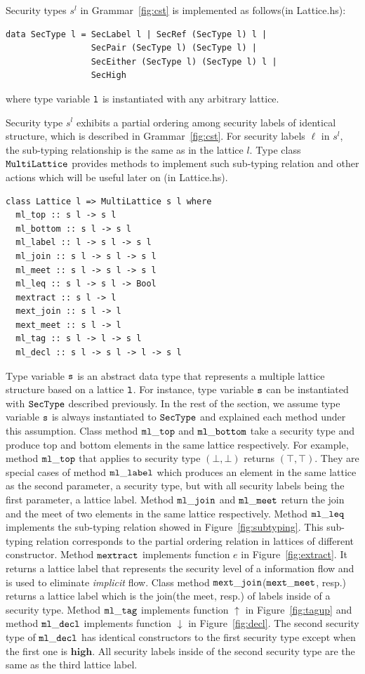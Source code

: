 \documentclass{report}
\newcommand{\co}[1]{$\cod{#1}$}
\newcommand{\st}{s^l}
\newcommand{\tagup}{\uparrow}
\newcommand{\decl}{\downarrow}
\begin{document}
Security types $\st$ in Grammar~\ref{fig:cst} is implemented as follows(in Lattice.hs):
\begin{Verbatim}[fontsize=\small]
data SecType l = SecLabel l | SecRef (SecType l) l | 
                 SecPair (SecType l) (SecType l) |
                 SecEither (SecType l) (SecType l) l |
                 SecHigh  
\end{Verbatim}
where type variable \co{l} is instantiated with any arbitrary lattice.

Security type $\st$ exhibits a partial ordering among security labels of identical
structure, which is described in Grammar~\ref{fig:cst}.
For security labels $\ell$ in $\st$, the sub-typing relationship is the same as in the lattice $l$.
Type class \co{MultiLattice} provides methods to implement such sub-typing relation and other
actions which will be useful later on (in Lattice.hs).
\begin{Verbatim}[fontsize=\small]
class Lattice l => MultiLattice s l where
  ml_top :: s l -> s l
  ml_bottom :: s l -> s l
  ml_label :: l -> s l -> s l
  ml_join :: s l -> s l -> s l
  ml_meet :: s l -> s l -> s l
  ml_leq :: s l -> s l -> Bool
  mextract :: s l -> l
  mext_join :: s l -> l
  mext_meet :: s l -> l
  ml_tag :: s l -> l -> s l
  ml_decl :: s l -> s l -> l -> s l
\end{Verbatim} 
Type variable \co{s} is an abstract data type that represents a multiple lattice
structure based on a lattice \co{l}. For instance, type variable \co{s} can be instantiated
with \co{SecType} described previously. In the rest of the section, we assume type
variable \co{s} is always instantiated to \co{SecType} and explained each method under this assumption.
Class method \co{ml\_top} and \co{ml\_bottom} take a security type 
and produce top and bottom elements in the same lattice respectively.
For example, method \co{ml\_top} that applies to security type $(\bot,\bot)$ returns $(\top,\top)$.
They are special cases of method \co{ml\_label} which produces an element in the
same lattice as the second parameter, a security type, but with all security labels being 
the first parameter, a lattice label.
Method \co{ml\_join} and \co{ml\_meet} return the join and the meet of two
elements in the same lattice respectively.
Method \co{ml\_leq} implements the sub-typing relation showed in 
Figure~\ref{fig:subtyping}. This sub-typing relation corresponds to the partial
ordering relation in lattices of different constructor.
Method \co{mextract} implements function $e$ in Figure~\ref{fig:extract}. It returns 
a lattice label that represents the security level of a information flow and is used
to eliminate {\em implicit} flow.
Class method \co{mext\_join}(\co{mext\_meet}, resp.) returns a lattice label which is
the join(the meet, resp.) of labels inside of a security type. 
Method \co{ml\_tag} implements function $\tagup$ in Figure~\ref{fig:tagup} and
method \co{ml\_decl} implements function $\decl$ in Figure~\ref{fig:decl}. The 
second security type of \co{ml\_decl} has identical constructors to the 
first security type except when the first one is $\mathbf{high}$.
All security labels inside of the second security type are the same as the third lattice 
label.
\end{document}
